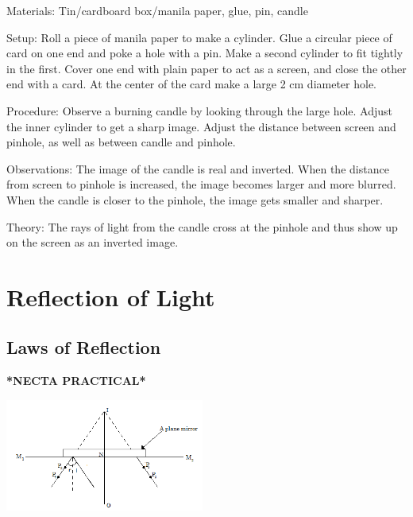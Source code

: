 \begin{multicols}{2}
\begin{description*}
\item[Materials:]{Tin/cardboard box/manila paper, glue, pin, candle}
\item[Setup:]{Roll a piece of manila paper to make a cylinder. Glue a circular piece of card on one end and poke a hole with a pin. Make a second cylinder to fit tightly in the first. Cover one end with plain paper to act as a screen, and close the other end with a card. At the center of the card make a large 2 cm diameter hole.}
\item[Procedure:]{Observe a burning candle by looking through the large hole. Adjust the inner cylinder to get a sharp image. Adjust the distance between screen and pinhole, as well as between candle and pinhole.}
\item[Observations:]{The image of the candle is real and inverted. When the distance from screen to pinhole is increased, the image becomes larger and more blurred. When the candle is closer to the pinhole, the image gets smaller and sharper.}
\item[Theory:]{The rays of light from the candle cross at the pinhole and thus show up on the screen as an inverted image.}
\end{description*}


\section*{Reflection of Light}


\subsection{Laws of Reflection}
\textbf{*NECTA PRACTICAL*}

\begin{center}
\includegraphics[width=0.49\textwidth]{./img/plane-mirror-prac.png}
\end{center}


\end{multicols}
